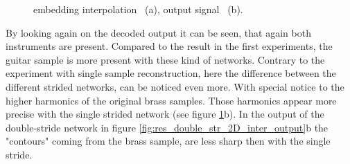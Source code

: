 \begin{figure}[htb!]
    \centering
    \caption{embedding interpolation ~(a), output signal ~(b).}
    \label{fig:res_single_str_2D_inter_output}
\end{figure}

By looking again on the decoded output it can be seen, that again both instruments are present. Compared to the result in the first experiments, the guitar sample is more present with these kind of networks. Contrary to the experiment with single sample reconstruction, here the difference between the different strided networks, can be noticed even more. With special notice to the higher harmonics of the original brass samples. Those harmonics appear more precise with the single strided network (see figure \ref{fig:res_single_str_2D_inter_output}b). In the output of the double-stride network in figure \ref{fig:res_double_str_2D_inter_output}b the "contours" coming from the brass sample, are less sharp then with the single stride.

